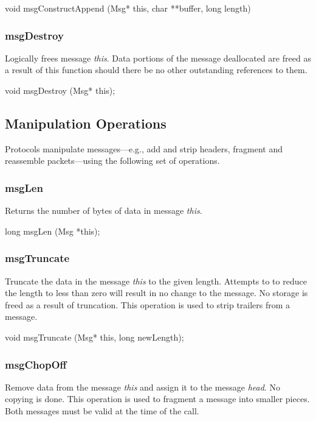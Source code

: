 \medskip

{\sem void} {\bold msgConstructAppend} ({\sem Msg*} {\caps this},
	{\sem char} **{\caps buffer},
	{\sem long} {\caps length})

\subsubsection{msgDestroy}

Logically frees message {\em this}. Data portions of the
message deallocated are freed as a result of this function
should there be no other outstanding references to them.
\medskip

{\sem void} {\bold msgDestroy} ({\sem Msg*} {\caps this});

\subsection{Manipulation Operations}

Protocols manipulate messages---e.g., add and strip headers, fragment
and reassemble packets---using the following set of operations.

\subsubsection{msgLen}

Returns the number of bytes of data in message {\em this}.
\medskip

{\sem long} {\bold msgLen} ({\sem Msg} *{\caps this});
\medskip

\subsubsection{msgTruncate}

Truncate the data in the message {\em this} to the given length.
Attempts to to reduce the length to less than zero will result in no
change to the message.  No storage is freed as a result of truncation.
This operation is used to strip trailers from a message.
\medskip

{\sem void} {\bold msgTruncate} ({\sem Msg*} {\caps this}, {\sem long} {\caps newLength});
\medskip

\subsubsection{msgChopOff}

Remove data from the message {\em this} and assign it to the message
{\em head}.  No copying is done. This operation is used to fragment
a message into smaller pieces.  Both messages must be valid at the
time of the call.
\medskip

